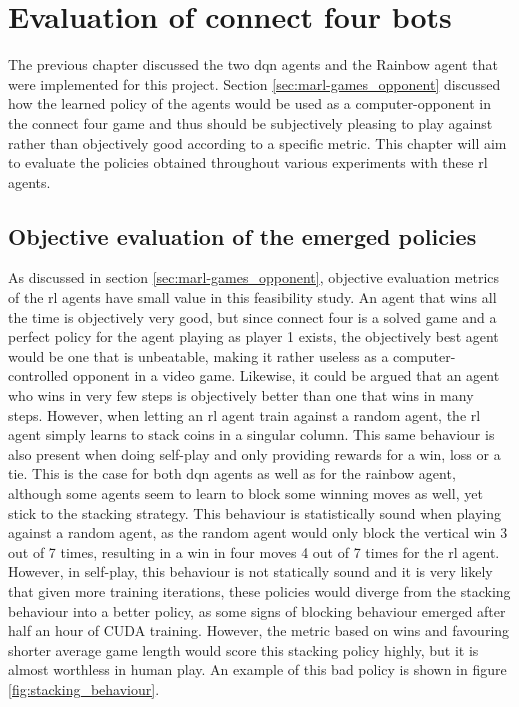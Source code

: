 \chapter{Evaluation of connect four bots}
\label{ch:connect_four_eval}

The previous chapter discussed the two \gls{dqn} agents and the Rainbow agent that were implemented for this project.
Section \ref{sec:marl-games_opponent} discussed how the learned policy of the agents would be used as a computer-opponent in the connect four game and thus should be subjectively pleasing to play against rather than objectively good according to a specific metric.
This chapter will aim to evaluate the policies obtained throughout various experiments with these \gls{rl} agents.


\section{Objective evaluation of the emerged policies}
\label{sec:connect_four_eval-metrics}

As discussed in section \ref{sec:marl-games_opponent}, objective evaluation metrics of the \gls{rl} agents have small value in this feasibility study.
An agent that wins all the time is objectively very good, but since connect four is a solved game and a perfect policy for the agent playing as player 1 exists, the objectively best agent would be one that is unbeatable, making it rather useless as a computer-controlled opponent in a video game.
Likewise, it could be argued that an agent who wins in very few steps is objectively better than one that wins in many steps.
However, when letting an \gls{rl} agent train against a random agent, the \gls{rl} agent simply learns to stack coins in a singular column.
This same behaviour is also present when doing self-play and only providing rewards for a win, loss or a tie.
This is the case for both \gls{dqn} agents as well as for the rainbow agent, although some agents seem to learn to block some winning moves as well, yet stick to the stacking strategy.
This behaviour is statistically sound when playing against a random agent, as the random agent would only block the vertical win 3 out of 7 times, resulting in a win in four moves 4 out of 7 times for the \gls{rl} agent.
However, in self-play, this behaviour is not statically sound and it is very likely that given more training iterations, these policies would diverge from the stacking behaviour into a better policy, as some signs of blocking behaviour emerged after half an hour of CUDA training.
However, the metric based on wins and favouring shorter average game length would score this stacking policy highly, but it is almost worthless in human play.
An example of this bad policy is shown in figure \ref{fig:stacking_behaviour}.

